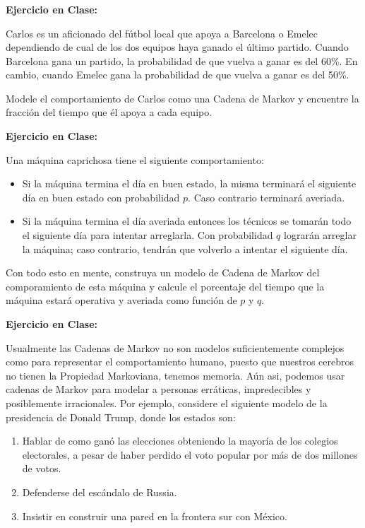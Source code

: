 \documentclass[ 10pt, xcolor = dvipsnames]{beamer}
\begin{document}
\begin{frame}[allowframebreaks]
\frametitle{\insertsubsection}

\textbf{Ejercicio en Clase:}

Carlos es un aficionado del f\'utbol local que apoya a Barcelona o Emelec dependiendo de cual de los dos equipos haya ganado el \'ultimo partido. \linebreak Cuando Barcelona gana un partido, la probabilidad de que vuelva a ganar es \linebreak del 60\%. En cambio, cuando Emelec gana la probabilidad de que vuelva a ganar es del 50\%. 

Modele el comportamiento de Carlos como una Cadena de Markov y encuentre la fracci\'on del tiempo que \'el apoya a cada equipo. 

\framebreak

\textbf{Ejercicio en Clase:}

Una m\'aquina caprichosa tiene el siguiente comportamiento: 
\begin{itemize}
\item Si la m\'aquina termina el d\'ia en buen estado, la misma terminar\'a el siguiente d\'ia en buen estado con probabilidad $p$. Caso contrario terminar\'a averiada. 
\item Si la m\'aquina termina el d\'ia averiada entonces los t\'ecnicos se tomar\'an todo el siguiente d\'ia para intentar arreglarla. Con probabilidad $q$ lograr\'an arreglar la m\'aquina; caso contrario, tendr\'an que volverlo a intentar el siguiente d\'ia. 
\end{itemize}

Con todo esto en mente, construya un modelo de Cadena de Markov del comporamiento de esta m\'aquina y calcule el porcentaje del tiempo que la m\'aquina estar\'a operativa y averiada como funci\'on de $p$ y $q$. 

\framebreak

\textbf{Ejercicio en Clase:}

Usualmente las Cadenas de Markov no son modelos suficientemente complejos como para representar el comportamiento humano, puesto que nuestros cerebros no tienen la Propiedad Markoviana, \ie tenemos memoria. A\'un asi, podemos usar cadenas de Markov para modelar a personas err\'aticas, impredecibles y posiblemente irracionales. Por ejemplo, considere el siguiente modelo de la presidencia de Donald Trump, donde los estados son: 
\begin{enumerate}
\item Hablar de como gan\'o las elecciones obteniendo la mayor\'ia de los colegios electorales, \linebreak a pesar de haber perdido el voto popular por m\'as de dos millones de votos. 
\item Defenderse del esc\'andalo de Russia. 
\item Insistir en construir una pared en la frontera sur con M\'exico. 
\framebreak


\end{enumerate}
\end{frame}
\end{document}
